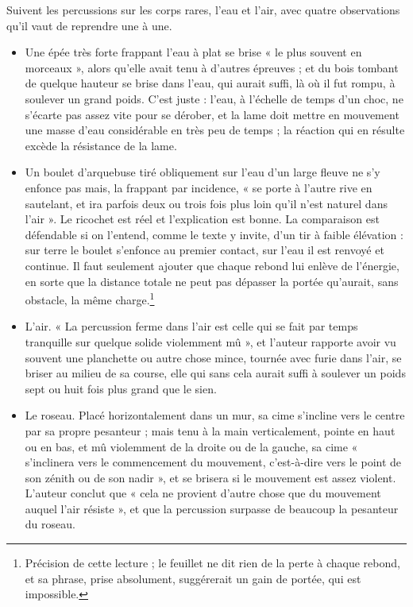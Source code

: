 \documentclass[11pt,a4paper]{article}
\begin{document}
Suivent les percussions sur les corps rares, l'eau et l'air, avec quatre
observations qu'il vaut de reprendre une à une.

\begin{itemize}
  \item Une épée très forte frappant l'eau à plat se brise « le plus souvent en
    morceaux », alors qu'elle avait tenu à d'autres épreuves ; et du bois tombant
    de quelque hauteur se brise dans l'eau, qui aurait suffi, là où il fut rompu,
    à soulever un grand poids. C'est juste : l'eau, à l'échelle de temps d'un
    choc, ne s'écarte pas assez vite pour se dérober, et la lame doit mettre en
    mouvement une masse d'eau considérable en très peu de temps ; la réaction qui
    en résulte excède la résistance de la lame.
  \item Un boulet d'arquebuse tiré obliquement sur l'eau d'un large fleuve ne
    s'y enfonce pas mais, la frappant par incidence, « se porte à l'autre rive en
    sautelant, et ira parfois deux ou trois fois plus loin qu'il n'est naturel
    dans l'air ». Le ricochet est réel et l'explication est bonne. La comparaison
    est défendable si on l'entend, comme le texte y invite, d'un tir à faible
    élévation : sur terre le boulet s'enfonce au premier contact, sur l'eau il
    est renvoyé et continue. Il faut seulement ajouter que chaque rebond lui
    enlève de l'énergie, en sorte que la distance totale ne peut pas dépasser la
    portée qu'aurait, sans obstacle, la même charge.\footnote{Précision de cette
    lecture ; le feuillet ne dit rien de la perte à chaque rebond, et sa phrase,
    prise absolument, suggérerait un gain de portée, qui est impossible.}
  \item L'air. « La percussion ferme dans l'air est celle qui se fait par temps
    tranquille sur quelque solide violemment mû », et l'auteur rapporte avoir vu
    souvent une planchette ou autre chose mince, tournée avec furie dans l'air,
    se briser au milieu de sa course, elle qui sans cela aurait suffi à soulever
    un poids sept ou huit fois plus grand que le sien.
  \item Le roseau. Placé horizontalement dans un mur, sa cime s'incline vers le
    centre par sa propre pesanteur ; mais tenu à la main verticalement, pointe en
    haut ou en bas, et mû violemment de la droite ou de la gauche, sa cime
    « s'inclinera vers le commencement du mouvement, c'est-à-dire vers le point
    de son zénith ou de son nadir », et se brisera si le mouvement est assez
    violent. L'auteur conclut que « cela ne provient d'autre chose que du
    mouvement auquel l'air résiste », et que la percussion surpasse de beaucoup
    la pesanteur du roseau.
\end{itemize}
\end{document}
